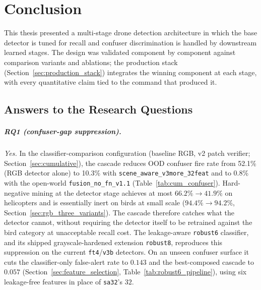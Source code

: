 \chapter{Conclusion}
\label{ch:conclusion}

This thesis presented a multi-stage drone detection architecture in which the base detector is tuned for recall and confuser discrimination is handled by downstream learned stages. The design was validated component by component against comparison variants and ablations; the production stack (Section~\ref{sec:production_stack}) integrates the winning component at each stage, with every quantitative claim tied to the command that produced it.

\section{Answers to the Research Questions}
\label{sec:rq_answers}

\paragraph{RQ1 (confuser-gap suppression).}
\emph{Yes.} In the classifier-comparison configuration (baseline RGB, v2 patch verifier; Section~\ref{sec:cumulative}), the cascade reduces OOD confuser fire rate from 52.1\% (RGB detector alone) to 10.3\% with \texttt{scene\_aware\_v3more\_32feat} and to 0.8\% with the open-world \texttt{fusion\_no\_fn\_v1.1} (Table~\ref{tab:cum_confuser}). Hard-negative mining at the detector stage achieves at most $66.2\% \to 41.9\%$ on helicopters and is essentially inert on birds at small scale ($94.4\% \to 94.2\%$, Section~\ref{sec:rgb_three_variants}). The cascade therefore catches what the detector cannot, without requiring the detector itself to be retrained against the bird category at unacceptable recall cost. The leakage-aware \texttt{robust6} classifier, and its shipped grayscale-hardened extension \texttt{robust8}, reproduces this suppression on the current \texttt{ft4}/\texttt{v3b} detectors. On an unseen confuser surface it cuts the classifier-only false-alert rate to $0.143$ and the best-composed cascade to $0.057$ (Section~\ref{sec:feature_selection}, Table~\ref{tab:robust6_pipeline}), using six leakage-free features in place of \texttt{sa32}'s $32$.

